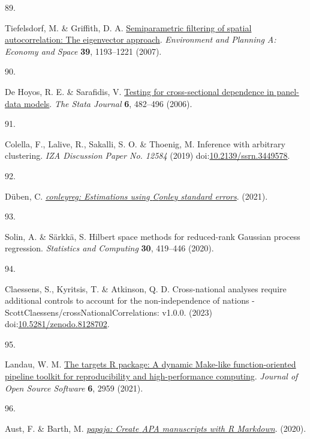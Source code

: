 \documentclass[
  man,floatsintext]{apa6}
\newlength{\cslhangindent}
\newlength{\csllabelwidth}
\newlength{\cslentryspacingunit} %
\newenvironment{CSLReferences}[2] %
 {%
  \setlength{\parindent}{0pt}
  \ifodd #1
  \let\oldpar\par
  \def\par{\hangindent=\cslhangindent\oldpar}
  \fi
  \setlength{\parskip}{#2\cslentryspacingunit}
 }%
 {}
\newcommand{\CSLLeftMargin}[1]{\parbox[t]{\csllabelwidth}{#1}}
\newcommand{\CSLRightInline}[1]{\parbox[t]{\linewidth - \csllabelwidth}{#1}\break}
\begin{document}
\begin{CSLReferences}{0}{0}
\leavevmode{}%
\CSLLeftMargin{89. }%
\CSLRightInline{Tiefelsdorf, M. \& Griffith, D. A. \href{https://doi.org/10.1068/a37378}{Semiparametric filtering of spatial autocorrelation: The eigenvector approach}. \emph{Environment and Planning A: Economy and Space} \textbf{39}, 1193--1221 (2007).}

\leavevmode{}%
\CSLLeftMargin{90. }%
\CSLRightInline{De Hoyos, R. E. \& Sarafidis, V. \href{https://doi.org/10.1177/1536867X0600600403}{Testing for cross-sectional dependence in panel-data models}. \emph{The Stata Journal} \textbf{6}, 482--496 (2006).}

\leavevmode{}%
\CSLLeftMargin{91. }%
\CSLRightInline{Colella, F., Lalive, R., Sakalli, S. O. \& Thoenig, M. Inference with arbitrary clustering. \emph{IZA Discussion Paper No. 12584} (2019) doi:\href{https://doi.org/10.2139/ssrn.3449578}{10.2139/ssrn.3449578}.}

\leavevmode{}%
\CSLLeftMargin{92. }%
\CSLRightInline{Düben, C. \emph{\href{https://CRAN.R-project.org/package=conleyreg}{{conleyreg}: Estimations using {C}onley standard errors}}. (2021).}

\leavevmode{}%
\CSLLeftMargin{93. }%
\CSLRightInline{Solin, A. \& Särkkä, S. Hilbert space methods for reduced-rank {G}aussian process regression. \emph{Statistics and Computing} \textbf{30}, 419--446 (2020).}

\leavevmode{}%
\CSLLeftMargin{94. }%
\CSLRightInline{Claessens, S., Kyritsis, T. \& Atkinson, Q. D. Cross-national analyses require additional controls to account for the non-independence of nations - ScottClaessens/crossNationalCorrelations: v1.0.0. (2023) doi:\href{https://doi.org/10.5281/zenodo.8128702}{10.5281/zenodo.8128702}.}

\leavevmode{}%
\CSLLeftMargin{95. }%
\CSLRightInline{Landau, W. M. \href{https://doi.org/10.21105/joss.02959}{The targets {R} package: A dynamic {M}ake-like function-oriented pipeline toolkit for reproducibility and high-performance computing}. \emph{Journal of Open Source Software} \textbf{6}, 2959 (2021).}

\leavevmode{}%
\CSLLeftMargin{96. }%
\CSLRightInline{Aust, F. \& Barth, M. \emph{\href{https://github.com/crsh/papaja}{{papaja}: {Create} {APA} manuscripts with {R Markdown}}}. (2020).}

\end{CSLReferences}
\end{document}
